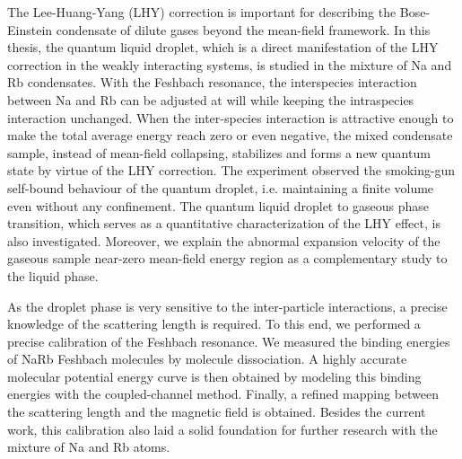 The Lee-Huang-Yang (LHY) correction is important for describing the Bose-Einstein condensate of dilute gases beyond the mean-field framework. In this thesis, the quantum liquid droplet, which is a direct manifestation of the LHY correction in the weakly interacting systems, is studied in the mixture of Na and Rb condensates. With the Feshbach resonance, the interspecies interaction between Na and Rb can be adjusted at will while keeping the intraspecies interaction unchanged. When the inter-species interaction is attractive enough to make the total average energy reach zero or even negative, the mixed condensate sample, instead of mean-field collapsing, stabilizes and forms a new quantum state by virtue of the LHY correction. The experiment observed the smoking-gun self-bound behaviour of the quantum droplet, i.e. maintaining a finite volume even without any confinement. The quantum liquid droplet to gaseous phase transition, which serves as a quantitative characterization of the LHY effect, is also investigated. Moreover, we explain the abnormal expansion velocity of the gaseous sample near-zero mean-field energy region as a complementary study to the liquid phase.

As the droplet phase is very sensitive to the inter-particle interactions, a precise knowledge of the scattering length is required. To this end, we performed a precise calibration of the Feshbach resonance. We measured the binding energies of NaRb Feshbach molecules by molecule dissociation. A highly accurate molecular potential energy curve is then obtained by modeling this binding energies with the coupled-channel method.  Finally, a refined mapping between the scattering length and the magnetic field is obtained. Besides the current work, this calibration also laid a solid foundation for further research with the mixture of Na and Rb atoms.